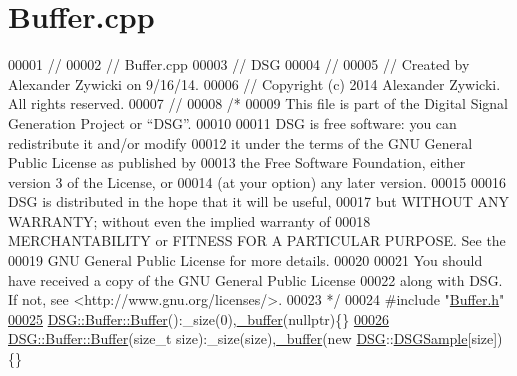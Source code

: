 \hypertarget{_buffer_8cpp_source}{\section{Buffer.\+cpp}
\label{_buffer_8cpp_source}
}

\begin{DoxyCode}
00001 \textcolor{comment}{//}
00002 \textcolor{comment}{//  Buffer.cpp}
00003 \textcolor{comment}{//  DSG}
00004 \textcolor{comment}{//}
00005 \textcolor{comment}{//  Created by Alexander Zywicki on 9/16/14.}
00006 \textcolor{comment}{//  Copyright (c) 2014 Alexander Zywicki. All rights reserved.}
00007 \textcolor{comment}{//}
00008 \textcolor{comment}{/*}
00009 \textcolor{comment}{ This file is part of the Digital Signal Generation Project or “DSG”.}
00010 \textcolor{comment}{}
00011 \textcolor{comment}{ DSG is free software: you can redistribute it and/or modify}
00012 \textcolor{comment}{ it under the terms of the GNU General Public License as published by}
00013 \textcolor{comment}{ the Free Software Foundation, either version 3 of the License, or}
00014 \textcolor{comment}{ (at your option) any later version.}
00015 \textcolor{comment}{}
00016 \textcolor{comment}{ DSG is distributed in the hope that it will be useful,}
00017 \textcolor{comment}{ but WITHOUT ANY WARRANTY; without even the implied warranty of}
00018 \textcolor{comment}{ MERCHANTABILITY or FITNESS FOR A PARTICULAR PURPOSE.  See the}
00019 \textcolor{comment}{ GNU General Public License for more details.}
00020 \textcolor{comment}{}
00021 \textcolor{comment}{ You should have received a copy of the GNU General Public License}
00022 \textcolor{comment}{ along with DSG.  If not, see <http://www.gnu.org/licenses/>.}
00023 \textcolor{comment}{ */}
00024 \textcolor{preprocessor}{#include "\hyperlink{_buffer_8h}{Buffer.h}"}
\hypertarget{_buffer_8cpp_source_l00025}{}\hyperlink{class_d_s_g_1_1_buffer_aa764dd8c389dcff51de08cb81fafeb86}{00025} \hyperlink{class_d_s_g_1_1_buffer_aa764dd8c389dcff51de08cb81fafeb86}{DSG::Buffer::Buffer}():\_size(0),\hyperlink{_driver_8cpp_acce4d24812914a6b276156d1a3d3e851}{\_buffer}(nullptr)\{\}
\hypertarget{_buffer_8cpp_source_l00026}{}\hyperlink{class_d_s_g_1_1_buffer_a0e6502fd61833043744f9df94e8d5111}{00026} \hyperlink{class_d_s_g_1_1_buffer_aa764dd8c389dcff51de08cb81fafeb86}{DSG::Buffer::Buffer}(\textcolor{keywordtype}{size\_t} size):\_size(size),\hyperlink{_driver_8cpp_acce4d24812914a6b276156d1a3d3e851}{\_buffer}(new 
      \hyperlink{namespace_d_s_g}{DSG}::\hyperlink{namespace_d_s_g_ac39a94cd27ebcd9c1e7502d0c624894a}{DSGSample}[size])\{\}

\end{DoxyCode}
